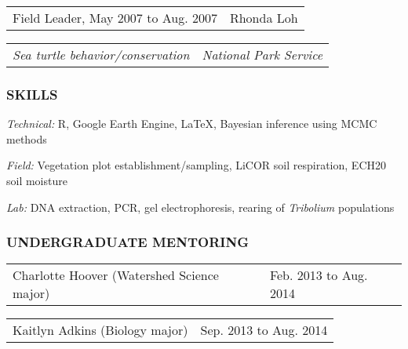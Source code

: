 \documentclass[11pt,english]{article}
\providecommand{\tabularnewline}{\\}
\begin{document}
\begin{tabular}{>{\raggedright}p{3in}>{\raggedleft}p{3in}}
Field Leader, May 2007 to Aug. 2007 & Rhonda Loh\tabularnewline
\end{tabular}

\begin{tabular}{>{\raggedright}p{3in}>{\raggedleft}p{3in}}
\hspace{1.5em}\emph{Sea turtle behavior/conservation} & \emph{National Park Service}
\end{tabular}


\subsubsection*{SKILLS}
\vspace{-0.5ex}

\begin{hangparas}{0.25in}{1}
\hspace{0.575em}\emph{Technical:} R, Google Earth Engine, \LaTeX{}, Bayesian inference using MCMC methods

\hspace{0.575em}\emph{Field:} Vegetation plot establishment/sampling, LiCOR soil respiration, ECH20 soil moisture 

\hspace{0.575em}\emph{Lab:} DNA extraction, PCR, gel electrophoresis, rearing of \emph{Tribolium} populations

\end{hangparas}
\vspace{1ex}


\subsubsection*{UNDERGRADUATE MENTORING}
\vspace{-0.5ex}

\begin{tabular}{>{\raggedright}p{4in}>{\raggedleft}p{2in}}
Charlotte Hoover (Watershed Science major) & Feb. 2013 to Aug. 2014 \tabularnewline
\end{tabular}

\begin{tabular}{>{\raggedright}p{4in}>{\raggedleft}p{2in}}
Kaitlyn Adkins (Biology major) & Sep. 2013 to Aug. 2014\tabularnewline
\end{tabular}
\end{document}
